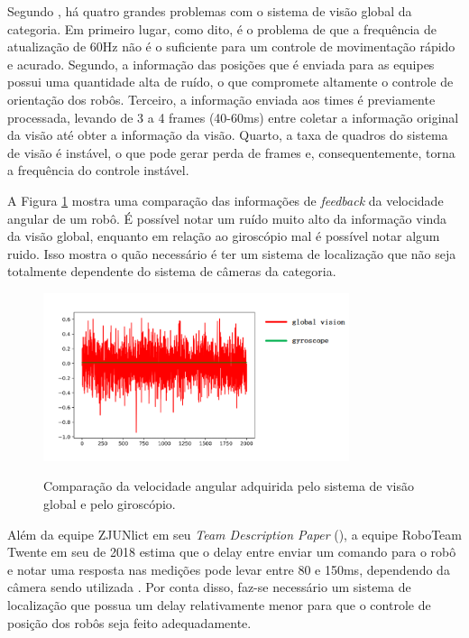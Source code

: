 \documentclass[acronym, symbols, table]{fei}
\begin{document}
			Segundo \textcite{tdpZJUNlict2020}, há quatro grandes problemas com o sistema de visão global da categoria. Em primeiro lugar, como dito, é o problema de que a frequência de atualização de 60Hz não é o suficiente para um controle de movimentação rápido e acurado. Segundo, a informação das posições que é enviada para as equipes possui uma quantidade alta de ruído, o que compromete altamente o controle de orientação dos robôs. Terceiro, a informação enviada aos times é previamente processada, levando de 3 a 4 frames (40-60ms) entre coletar a informação original da visão até obter a informação da visão. Quarto, a taxa de quadros do sistema de visão é instável, o que pode gerar perda de frames e, consequentemente, torna a frequência do controle instável.
			
			A Figura \ref{fig:comparison_cameras_gyroscope} mostra uma comparação das informações de \textit{feedback} da velocidade angular de um robô. É possível notar um ruído muito alto da informação vinda da visão global, enquanto em relação ao giroscópio mal é possível notar algum ruido. Isso mostra o quão necessário é ter um sistema de localização que não seja totalmente dependente do sistema de câmeras da categoria.
			
			\begin{figure}[!htb]
					\centering
					\caption{Comparação da velocidade angular adquirida pelo sistema de visão global e pelo giroscópio.} 
					\includegraphics[width=0.8\textwidth]{Comparacao_cameras_giroscopio.png}
					\label{fig:comparison_cameras_gyroscope}
				\end{figure}
		
			Além da equipe ZJUNlict em seu \textit{Team Description Paper} (), a equipe RoboTeam Twente em seu  de 2018 estima que o delay entre enviar um comando para o robô e notar uma resposta nas medições pode levar entre 80 e 150ms, dependendo da câmera sendo utilizada \cite{tdptwente2018}. Por conta disso, faz-se necessário um sistema de localização que possua um delay relativamente menor para que o controle de posição dos robôs seja feito adequadamente.
			
\end{document}
